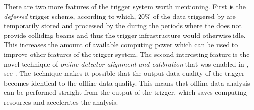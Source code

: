 There are two more features of the \lhcb trigger system worth mentioning. First is the {\it deferred}
trigger scheme, according to which, $20\%$ of the data triggered by \lzero are temporarily stored and processed by the \hlt
during the periods where the \lhc does not provide colliding beams and thus the \lhcb trigger infrastructure
would otherwise idle. This increases the amount of available computing power which can be used
to improve other features of the trigger system. The second interesting feature is the novel technique of
{\it online detector alignment and calibration} that was enabled in \runtwo, see \cite{Aaij:2016rxn}.
The technique makes it possible that the output data quality of the trigger becomes identical to the offline data quality.
This means that offline data analysis can be performed straight from the output of the trigger,
which saves computing resources and accelerates the analysis.
